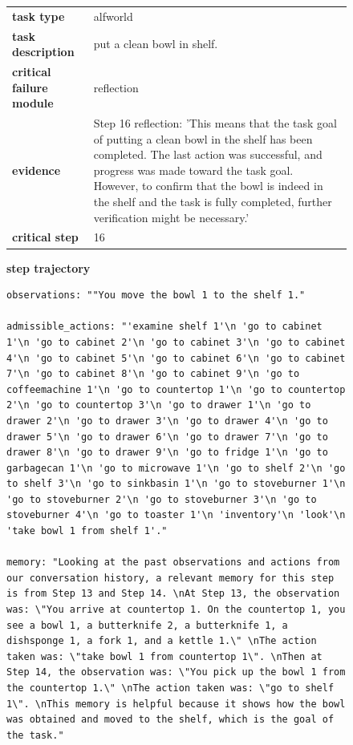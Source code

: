 \documentclass[../../main.tex]{subfiles}
\begin{document}
\begin{figure}[htbp]
\centering

\begin{tcolorbox}[
    title=\textbf{Error Type - Progress Misjudge},
    colback=orange!1!white,
    colframe=orange!50!black,
    fonttitle=\bfseries,
    enhanced jigsaw,
    breakable
]
\small


\begin{tabularx}{\linewidth}{@{}lX@{}}
\textbf{task type} & alfworld \\
\textbf{task description} & put a clean bowl in shelf. \\
\textbf{critical failure module} & reflection \\
\textbf{evidence} & Step 16 reflection: 'This means that the task goal of putting a clean bowl in the shelf has been completed. The last action was successful, and progress was made toward the task goal. However, to confirm that the bowl is indeed in the shelf and the task is fully completed, further verification might be necessary.' \\
\textbf{critical step} & 16 \\
\end{tabularx}

\medskip
\textbf{step trajectory}

\begin{Verbatim}[breaklines=true, breakanywhere=true]
observations: ""You move the bowl 1 to the shelf 1."

admissible_actions: "'examine shelf 1'\n 'go to cabinet 1'\n 'go to cabinet 2'\n 'go to cabinet 3'\n 'go to cabinet 4'\n 'go to cabinet 5'\n 'go to cabinet 6'\n 'go to cabinet 7'\n 'go to cabinet 8'\n 'go to cabinet 9'\n 'go to coffeemachine 1'\n 'go to countertop 1'\n 'go to countertop 2'\n 'go to countertop 3'\n 'go to drawer 1'\n 'go to drawer 2'\n 'go to drawer 3'\n 'go to drawer 4'\n 'go to drawer 5'\n 'go to drawer 6'\n 'go to drawer 7'\n 'go to drawer 8'\n 'go to drawer 9'\n 'go to fridge 1'\n 'go to garbagecan 1'\n 'go to microwave 1'\n 'go to shelf 2'\n 'go to shelf 3'\n 'go to sinkbasin 1'\n 'go to stoveburner 1'\n 'go to stoveburner 2'\n 'go to stoveburner 3'\n 'go to stoveburner 4'\n 'go to toaster 1'\n 'inventory'\n 'look'\n 'take bowl 1 from shelf 1'."

memory: "Looking at the past observations and actions from our conversation history, a relevant memory for this step is from Step 13 and Step 14. \nAt Step 13, the observation was: \"You arrive at countertop 1. On the countertop 1, you see a bowl 1, a butterknife 2, a butterknife 1, a dishsponge 1, a fork 1, and a kettle 1.\" \nThe action taken was: \"take bowl 1 from countertop 1\". \nThen at Step 14, the observation was: \"You pick up the bowl 1 from the countertop 1.\" \nThe action taken was: \"go to shelf 1\". \nThis memory is helpful because it shows how the bowl was obtained and moved to the shelf, which is the goal of the task."


\end{Verbatim}
\end{tcolorbox}
\end{figure}
\end{document}
